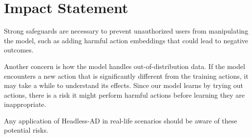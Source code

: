 \section*{Impact Statement}

Strong safeguards are necessary to prevent unauthorized users from manipulating the model, such as adding harmful action embeddings that could lead to negative outcomes.

Another concern is how the model handles out-of-distribution data. If the model encounters a new action that is significantly different from the training actions, it may take a while to understand its effects. Since our model learns by trying out actions, there is a risk it might perform harmful actions before learning they are inappropriate.

Any application of Headless-AD in real-life scenarios should be aware of these potential risks.